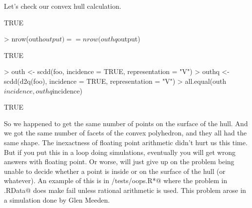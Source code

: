 \documentclass{article}
\begin{document}
Let's check our convex hull calculation.
\begin{Schunk}
\begin{Soutput}
[1] TRUE
\end{Soutput}
\begin{Sinput}
> nrow(outh$output) == nrow(outhq$output)
\end{Sinput}
\begin{Soutput}
[1] TRUE
\end{Soutput}
\begin{Sinput}
> outh <- scdd(foo, incidence = TRUE, representation = "V")
> outhq <- scdd(d2q(foo), incidence = TRUE, representation = "V")
> all.equal(outh$incidence, outhq$incidence)
\end{Sinput}
\begin{Soutput}
[1] TRUE
\end{Soutput}
\end{Schunk}
So we happened to get the same number of points on the surface of the
hull.  And we got the same number of facets of the convex polyhedron,
and they all had the same shape.  The inexactness of floating point
arithmetic didn't hurt us this time.  But if you put this in a loop
doing simulations, eventually you will get wrong answers with floating
point.  Or worse, \verb@scdd@ will just give up on the problem being
unable to decide whether a point is inside or on the surface of the
hull (or whatever).  An example of this is in \verb@rcdd/tests/oops.R*@
where the problem in \verb@oops.RData@ does make \verb@scdd@ fail
unless rational arithmetic is used.  This problem arose in a simulation
done by Glen Meeden.
\end{document}
